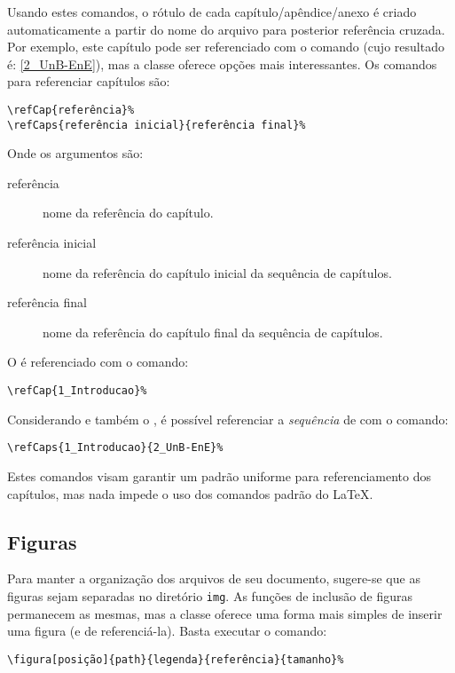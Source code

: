 Usando estes comandos, o rótulo de cada capítulo/apêndice/anexo é criado automaticamente a partir 
do nome do arquivo para posterior referência cruzada. Por exemplo, este capítulo pode ser 
referenciado com o comando  (cujo resultado é: \ref{2_UnB-EnE}), mas 
a classe oferece opções mais interessantes. Os comandos para referenciar capítulos são:

\begin{verbatim}
\refCap{referência}%
\refCaps{referência inicial}{referência final}%
\end{verbatim}

Onde os argumentos são:
\begin{description}
	\item[referência] nome da referência do capítulo.
	\item[referência inicial] nome da referência do capítulo inicial da sequência de capítulos.
	\item[referência final] nome da referência do capítulo final da sequência de capítulos.
\end{description}

O  é referenciado com o comando:
\begin{verbatim}
\refCap{1_Introducao}%
\end{verbatim}

Considerando  e também o , é possível referenciar a 
\emph{sequência} de  com o comando:
\begin{verbatim}
\refCaps{1_Introducao}{2_UnB-EnE}%
\end{verbatim}

Estes comandos visam garantir um padrão uniforme para referenciamento dos capítulos, mas nada
impede o uso dos comandos padrão do \LaTeX.

\subsection{Figuras}
Para manter a organização dos arquivos de seu documento, sugere-se que as figuras sejam separadas no
diretório \texttt{img}. As funções de inclusão de figuras permanecem as mesmas, mas a classe 
\unbene oferece uma forma mais simples de inserir uma figura (e de referenciá-la). Basta executar o 
comando:

\begin{verbatim}
\figura[posição]{path}{legenda}{referência}{tamanho}%
\end{verbatim}

